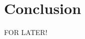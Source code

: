 \documentclass[11pt]{article}
\begin{document}
\section{Conclusion}
FOR LATER!

\footnotesize

\end{document}

